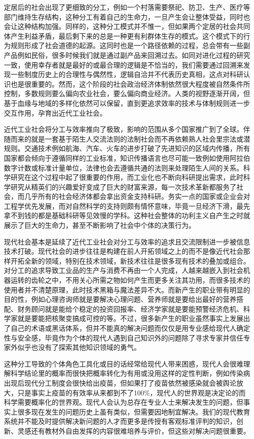 \documentclass[]{tufte-book}
\begin{document}
定居后的社会出现了更细致的分工，例如一个村落需要祭祀、防卫、生产、医疗等部门维持生存结构，这种分工有着自己的生命力，一旦产生会让整体受益，同时也会让这种结构加强。同样的，这种分工模式并不惟一，但如果两个定居的社会共同体产生利益矛盾，最后剩下来的总是一种更有利群体生存的模式。这个模式下的行为规则形成了社会道德的起源。这同时也是一个路径依赖的过程，总会带有一些副产品例如民俗，很多时候我们就是通过副产品来回溯过去。如同对进化过程的研究一致，使用幸存者就是最好的或最合理的逻辑是不恰当的，我们需要通过回溯来发现一些制度历史上的合理性与偶然性，逻辑自洽并不代表历史真相，这点对科研认识也是很重要的。然而，这个阶段的社会政治经济体制依然很大程度被自然条件所控制，多数规则要么偏向农业社会，要么偏向商业经济。人类的视野逐渐开阔，但基于血缘与地域的多样化依然可以保留，直到更追求效率的技术与体制规则进一步交互作用，孕育出近代工业社会。

近代工业社会将分工与效率推向了极致，影响的范围从多个国家推广到了全球。伴随而来的就是一套基于陌生人交流法则的法制社会而不再依赖熟人社会里宗法或潜规则。交通技术例如航海、汽车、火车的进步打破了先进知识的区域内传播，所有国家都会倾向于遵循同样的工业标准，知识传播语言也尽可能一致例如使用阿拉伯数字计数或标准计量单位，法律也会去遵循共通的法则来处理陌生人间的关系。科学研究在这个过程中起了很重要的作用，而工业化也不断向科研提出需求，此时科学研究从精英们的兴趣爱好变成了巨大的财富来源，每一次技术革新都服务了社会，而几乎所有的社会经济体都会拿出资金支持科研。务实一点的国家或企业会对工程学优先发展，而对自然科学的支持则颇有情怀意味，毕竟一旦经济下滑，最先拿不到钱的都是基础科研等见效慢的学科。这种社会整体的功利主义自产生之时就展示了巨大的生命力，甚至不断影响了社会中个体的决策行为。

现代社会基本是延续了近代工业社会对分工与效率的追求且交流限制进一步被信息技术打破。现代社会的进步往往是构建在前人开拓领域之上的而不是像近代社会那样开拓全新的领域，特别在技术领域，新技术往往是很多现有技术的叠加或组合。对分工的追求导致工业品的生产与消费不再由一个人完成，人越来越嵌入到社会机器运转的齿轮之中，不用关心所需之物如何产生而更多关注其功用，而很多技术的使用者并不清楚原理，此时技术黑箱与魔法差异不大。而新产生的职业带有明显的目的性，例如心理咨询师就是要解决心理问题、营养师就是要给出最好的营养搭配、财务顾问就是能给个稳定的投资回报率、经济学家就是要能预警经济危机、科学家就是要能把核聚变搞成可控的等。不过，很多新产生的职业虽然事实上发展出了自己的术语或黑话体系，但并不能真的解决问题而仅仅是用专业感给现代人确定性与安全感，毕竟作为个体的现代人遇到自己知识外的问题除了寻求专家并信任专家外似乎也没有了探索其他知识领域的勇气。

这种分工导致的个体角色工具化或目的话经常给现代人带来困惑，现代人会很难理解科学结论里的概率而很快把概率转化为有用或没用这样的定性判断，例如传染病出现后现代分工制度会很快给出疫苗，但如果打了疫苗依然被感染就会被舆论放大，只是事实上疫苗的有效率从来都到不了100\%，现代人的世界观是决定论的而科学需要概率化的世界观。现代人会认为总存在专业人士来解决发生的问题，但事实上很多现在发生的问题历史上虽有类似，但需要因地制宜解决。我们的现代教育系统并不能及时提供解决新问题的人才而更多是传授有客观标准评判的知识，创新、灵感还有教材外自由发挥的内容很难培养与评价，但这些对解决问题很重要。
\end{document}
